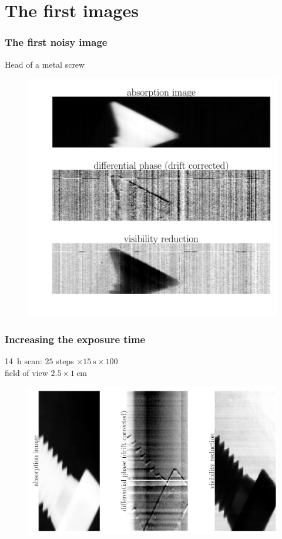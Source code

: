 \documentclass[first,firstsupp]{ETHclass}
\begin{document}
    \section{The first images}
    \begin{frame}
        \frametitle{The first noisy image}
        Head of a metal screw
        \begin{figure}[h]
            \centering
            \includegraphics[height=.65\textheight]{2013_04_16_screw.pdf}
        \end{figure}
    \end{frame}
    \begin{frame}
        \frametitle{Increasing the exposure time}
        \SI{14}{\hour} scan: $25$ steps $\times \SI{15}{\second} \times
        100$\\
        field of view $2.5\times\SI{1}{\centi\metre}$
        \begin{figure}[h]
            \centering
            \includegraphics[height=.6\textheight]{2013_05_16_screw.pdf}
        \end{figure}
    \end{frame}
\end{document}
